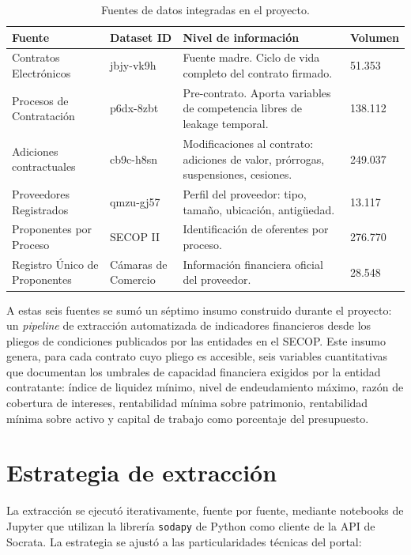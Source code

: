 \documentclass[12pt,letterpaper,oneside]{report}
\begin{document}
\begin{table}[h!]
\centering
\caption{Fuentes de datos integradas en el proyecto.}
\label{tab:fuentes}
\small
\begin{tabular}{p{3.5cm}p{2.5cm}p{6.5cm}p{2cm}}
\toprule
\textbf{Fuente} & \textbf{Dataset ID} & \textbf{Nivel de información} & \textbf{Volumen} \\
\midrule
Contratos Electrónicos & jbjy-vk9h & Fuente madre. Ciclo de vida completo del contrato firmado. & 51.353 \\
Procesos de Contratación & p6dx-8zbt & Pre-contrato. Aporta variables de competencia libres de leakage temporal. & 138.112 \\
Adiciones contractuales & cb9c-h8sn & Modificaciones al contrato: adiciones de valor, prórrogas, suspensiones, cesiones. & 249.037 \\
Proveedores Registrados & qmzu-gj57 & Perfil del proveedor: tipo, tamaño, ubicación, antigüedad. & 13.117 \\
Proponentes por Proceso & SECOP II & Identificación de oferentes por proceso. & 276.770 \\
Registro Único de Proponentes & Cámaras de Comercio & Información financiera oficial del proveedor. & 28.548 \\
\bottomrule
\end{tabular}
\end{table}

A estas seis fuentes se sumó un séptimo insumo construido durante el proyecto:
un \emph{pipeline} de extracción automatizada de indicadores financieros desde
los pliegos de condiciones publicados por las entidades en el SECOP. Este
insumo genera, para cada contrato cuyo pliego es accesible, seis variables
cuantitativas que documentan los umbrales de capacidad financiera exigidos por
la entidad contratante: índice de liquidez mínimo, nivel de endeudamiento
máximo, razón de cobertura de intereses, rentabilidad mínima sobre patrimonio,
rentabilidad mínima sobre activo y capital de trabajo como porcentaje del
presupuesto.

\section{Estrategia de extracción}

La extracción se ejecutó iterativamente, fuente por fuente, mediante notebooks
de Jupyter que utilizan la librería \texttt{sodapy} de Python como cliente de
la API de Socrata. La estrategia se ajustó a las particularidades técnicas del
portal:
\end{document}

